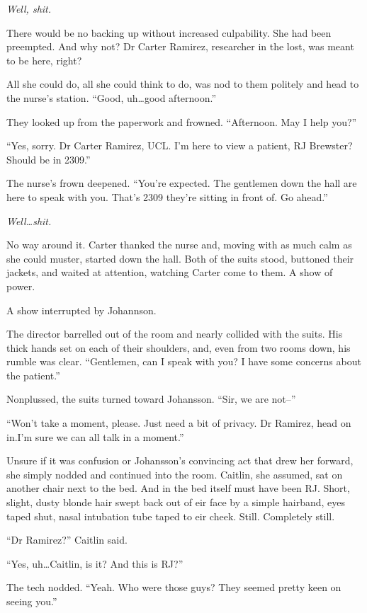 \emph{Well, shit.}

There would be no backing up without increased culpability. She had been preempted. And why not? Dr Carter Ramirez, researcher in the lost, was meant to be here, right?

All she could do, all she could think to do, was nod to them politely and head to the nurse's station. ``Good, uh\ldots{}good afternoon.''

They looked up from the paperwork and frowned. ``Afternoon. May I help you?''

``Yes, sorry. Dr Carter Ramirez, UCL. I'm here to view a patient, RJ Brewster? Should be in 2309.''

The nurse's frown deepened. ``You're expected. The gentlemen down the hall are here to speak with you. That's 2309 they're sitting in front of. Go ahead.''

\emph{Well\ldots{}shit.}

No way around it. Carter thanked the nurse and, moving with as much calm as she could muster, started down the hall. Both of the suits stood, buttoned their jackets, and waited at attention, watching Carter come to them. A show of power.

A show interrupted by Johannson.

The director barrelled out of the room and nearly collided with the suits. His thick hands set on each of their shoulders, and, even from two rooms down, his rumble was clear. ``Gentlemen, can I speak with you? I have some concerns about the patient.''

Nonplussed, the suits turned toward Johansson. ``Sir, we are not--''

``Won't take a moment, please. Just need a bit of privacy. Dr Ramirez, head on in.I'm sure we can all talk in a moment.''

Unsure if it was confusion or Johansson's convincing act that drew her forward, she simply nodded and continued into the room. Caitlin, she assumed, sat on another chair next to the bed. And in the bed itself must have been RJ. Short, slight, dusty blonde hair swept back out of eir face by a simple hairband, eyes taped shut, nasal intubation tube taped to eir cheek. Still. Completely still.

``Dr Ramirez?'' Caitlin said.

``Yes, uh\ldots{}Caitlin, is it? And this is RJ?''

The tech nodded. ``Yeah. Who were those guys? They seemed pretty keen on seeing you.''

